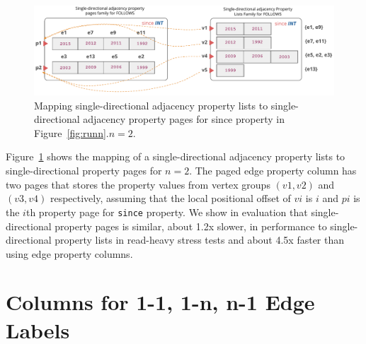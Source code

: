 
\begin{figure}
	\hfill\includegraphics[scale=0.78]{img/paged}\hspace*{\fill}
	\captionsetup{justification=centering}
	\caption{Mapping single-directional adjacency property lists to single-directional adjacency property pages for since property in Figure~\ref{fig:runn}.$n=2$.}
	\label{fig:paged}
\end{figure}

Figure~\ref{fig:paged} shows the mapping of a single-directional adjacency property lists to single-directional  property pages for $n=2$. The paged edge property column has two pages that stores the property values from vertex groups $(v1,v2)$ and $(v3,v4)$ respectively, assuming that the local positional offset of $vi$ is $i$ and $pi$ is the $i$th property page for \texttt{since} property. 
We show in evaluation that single-directional  property pages is similar, about 1.2x slower, in performance to single-directional property lists in read-heavy stress tests and about 4.5x faster than using edge property columns.

\section{Columns for 1-1, 1-n, n-1 Edge Labels}
\label{sec:single-cardinality-cols}

